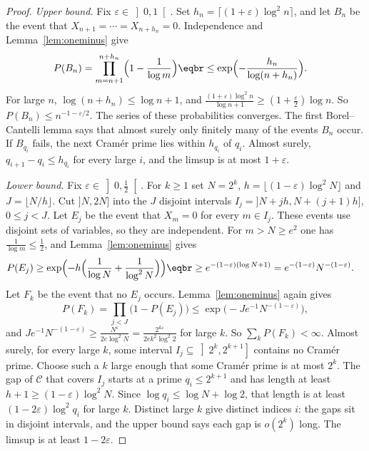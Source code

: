 \begin{proof}
\emph{Upper bound.} Fix $\varepsilon\in\left]0,1\right[$. Set $h_n=\lceil(1+\varepsilon)\log^2 n\rceil$, and let $B_n$ be the event that $X_{n+1}=\cdots=X_{n+h_n}=0$. Independence and Lemma~\ref{lem:oneminus} give
\[
\begin{aligned}P(B_n)&=\prod_{m=n+1}^{n+h_n}\Bigl(1-\frac1{\log m}\Bigr)\eqbr\le\exp\Bigl(-\frac{h_n}{\log(n+h_n)}\Bigr).\end{aligned}
\]
For large $n$, $\log(n+h_n)\le\log n+1$, and $\frac{(1+\varepsilon)\log^2 n}{\log n+1}\ge(1+\frac\varepsilon2)\log n$. So $P(B_n)\le n^{-1-\varepsilon/2}$. The series of these probabilities converges. The first Borel--Cantelli lemma says that almost surely only finitely many of the events $B_n$ occur. If $B_{q_i}$ fails, the next Cramér prime lies within $h_{q_i}$ of $q_i$. Almost surely, $q_{i+1}-q_i\le h_{q_i}$ for every large $i$, and the limsup is at most $1+\varepsilon$.

\emph{Lower bound.} Fix $\varepsilon\in\left]0,\frac12\right[$. For $k\ge1$ set $N=2^k$, $h=\lfloor(1-\varepsilon)\log^2 N\rfloor$ and $J=\lfloor N/h\rfloor$. Cut $]N,2N]$ into the $J$ disjoint intervals $I_j=]N+jh,N+(j+1)h]$, $0\le j<J$. Let $E_j$ be the event that $X_m=0$ for every $m\in I_j$. These events use disjoint sets of variables, so they are independent. For $m>N\ge e^2$ one has $\frac1{\log m}\le\frac12$, and Lemma~\ref{lem:oneminus} gives
\[
\begin{aligned}P(E_j)&\ge\exp\Bigl(-h\Bigl(\frac1{\log N}+\frac1{\log^2 N}\Bigr)\Bigr)\eqbr\ge e^{-(1-\varepsilon)(\log N+1)}=e^{-(1-\varepsilon)}N^{-(1-\varepsilon)}.\end{aligned}
\]
Let $F_k$ be the event that no $E_j$ occurs. Lemma~\ref{lem:oneminus} again gives
\[
P(F_k)=\prod_{j<J}\bigl(1-P(E_j)\bigr)\le\exp\bigl(-Je^{-1}N^{-(1-\varepsilon)}\bigr),
\]
and $Je^{-1}N^{-(1-\varepsilon)}\ge\frac{N^\varepsilon}{2e\log^2 N}=\frac{2^{k\varepsilon}}{2ek^2\log^2 2}$ for large $k$. So $\sum_k P(F_k)<\infty$. Almost surely, for every large $k$, some interval $I_j\subseteq\left]2^k,2^{k+1}\right]$ contains no Cramér prime. Choose such a $k$ large enough that some Cramér prime is at most $2^k$. The gap of $\mathcal C$ that covers $I_j$ starts at a prime $q_i\le 2^{k+1}$ and has length at least $h+1\ge(1-\varepsilon)\log^2 N$. Since $\log q_i\le\log N+\log 2$, that length is at least $(1-2\varepsilon)\log^2 q_i$ for large $k$. Distinct large $k$ give distinct indices $i$: the gaps sit in disjoint intervals, and the upper bound says each gap is $o(2^k)$ long. The limsup is at least $1-2\varepsilon$.
\end{proof}

